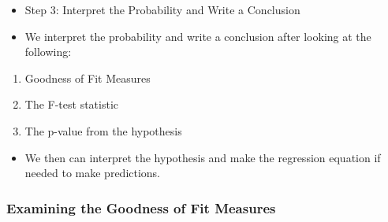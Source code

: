 \documentclass[
  letterpaper,
  DIV=11,
  numbers=noendperiod]{scrreprt}
\providecommand{\tightlist}{%
  \setlength{\itemsep}{0pt}\setlength{\parskip}{0pt}}\usepackage{longtable,booktabs,array}
\begin{document}
\begin{itemize}
\tightlist
\item
  Step 3: Interpret the Probability and Write a Conclusion
\item
  We interpret the probability and write a conclusion after looking at
  the following:
\end{itemize}

\begin{enumerate}
\def\labelenumi{\arabic{enumi}.}
\tightlist
\item
  Goodness of Fit Measures
\item
  The F-test statistic
\item
  The p-value from the hypothesis
\end{enumerate}

\begin{itemize}
\tightlist
\item
  We then can interpret the hypothesis and make the regression equation
  if needed to make predictions.
\end{itemize}

\subsubsection{Examining the Goodness of Fit
Measures}\label{examining-the-goodness-of-fit-measures}
\end{document}
